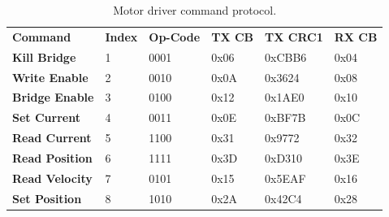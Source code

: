 \begin{table}
\centering
\begin{tabular}{llllll}
\textbf{Command}       & \textbf{Index} & \textbf{Op-Code} & \textbf{TX CB} & \textbf{TX CRC1} & \textbf{RX  CB} \\
\textbf{Kill Bridge}   & 1              & 0001             & 0x06           & 0xCBB6           & 0x04            \\
\textbf{Write Enable}  & 2              & 0010             & 0x0A           & 0x3624           & 0x08            \\
\textbf{Bridge Enable} & 3              & 0100             & 0x12           & 0x1AE0           & 0x10            \\
\textbf{Set Current}   & 4              & 0011             & 0x0E           & 0xBF7B           & 0x0C            \\
\textbf{Read Current}  & 5              & 1100             & 0x31           & 0x9772           & 0x32            \\
\textbf{Read Position} & 6              & 1111             & 0x3D           & 0xD310           & 0x3E            \\
\textbf{Read Velocity} & 7              & 0101             & 0x15           & 0x5EAF           & 0x16            \\
\textbf{Set Position}  & 8              & 1010             & 0x2A           & 0x42C4           & 0x28           
\end{tabular}
\caption{Motor driver command protocol.}
\label{tab:motor-driver-protocol}
\end{table}